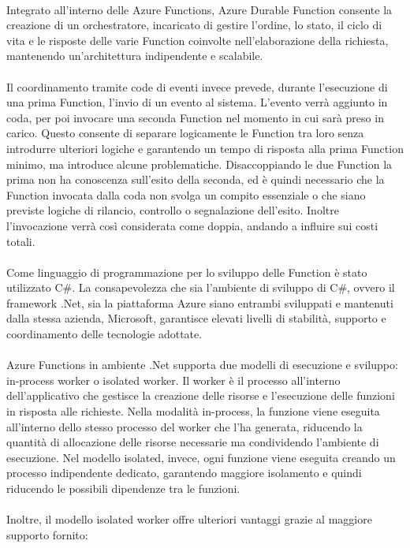 \\
Integrato all’interno delle Azure Functions, 
Azure Durable Function consente la creazione di un orchestratore,
incaricato di gestire l’ordine, lo stato, 
il ciclo di vita e le risposte delle varie Function coinvolte nell’elaborazione della richiesta,
mantenendo un'architettura indipendente e scalabile.\\
\\
Il coordinamento tramite code di eventi invece prevede, 
durante l'esecuzione di una prima Function, l'invio di un evento al sistema.
L'evento verrà aggiunto in coda, 
per poi invocare una seconda Function nel momento in cui sarà preso in carico.
Questo consente di separare logicamente le Function tra loro  
senza introdurre ulteriori logiche e garantendo un tempo di risposta alla prima Function minimo, 
ma introduce alcune problematiche.
Disaccoppiando le due Function la prima non ha conoscenza sull'esito della seconda,
ed è quindi necessario che la Function invocata dalla coda non svolga un compito essenziale 
o che siano previste logiche di rilancio, controllo o segnalazione dell'esito.
Inoltre l'invocazione verrà così considerata come doppia, andando a influire sui costi totali.\\
\\
Come linguaggio di programmazione per lo sviluppo delle Function è stato utilizzato C\#.
La consapevolezza che sia l'ambiente di sviluppo di C\#, 
ovvero il framework .Net, sia la piattaforma Azure 
siano entrambi sviluppati e mantenuti dalla stessa azienda, Microsoft,
garantisce elevati livelli di stabilità, supporto e coordinamento delle tecnologie adottate.\\
\\
Azure Functions in ambiente .Net supporta due modelli di esecuzione e sviluppo: 
in-process worker o isolated worker.
Il worker è il processo all’interno dell’applicativo che gestisce 
la creazione delle risorse e l’esecuzione delle funzioni in risposta alle richieste.
Nella modalità in-process, 
la funzione viene eseguita all’interno dello stesso processo del worker che l’ha generata,
riducendo la quantità di allocazione delle risorse necessarie 
ma condividendo l’ambiente di esecuzione.
Nel modello isolated, invece, 
ogni funzione viene eseguita creando un processo indipendente dedicato,
garantendo maggiore isolamento e quindi riducendo le possibili dipendenze tra le funzioni.\\
\\
Inoltre, il modello isolated worker offre ulteriori vantaggi grazie al maggiore supporto fornito:
